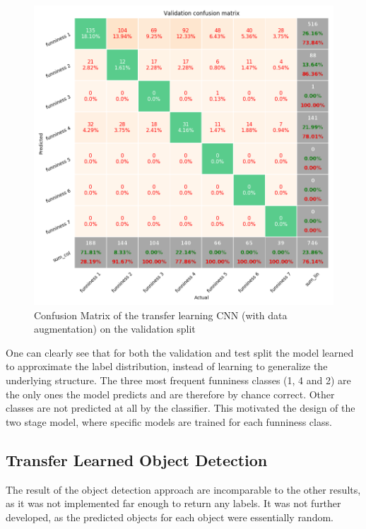 \documentclass[draft,final,oneside]{vutinfth} %
\begin{document}
\begin{figure}
	\centering
  	\includegraphics[width=1.0\textwidth]{graphics/transfer_confusion_val.png}
	\caption{Confusion Matrix of the transfer learning CNN (with data augmentation) on the validation split}
	\label{fig:confusionmatrixtransferlearningval}
\end{figure}

One can clearly see that for both the validation and test split the model learned to approximate the label distribution, instead of learning to generalize the underlying structure. The three most frequent funniness classes (1, 4 and 2) are the only ones the model predicts and are therefore by chance correct. Other classes are not predicted at all by the classifier. This motivated the design of the two stage model, where specific models are trained for each funniness class.


\subsection{Transfer Learned Object Detection}

The result of the object detection approach are incomparable to the other results, as it was not implemented far enough to return any labels. It was not further developed, as the predicted objects for each object were essentially random.
\end{document}
